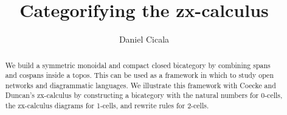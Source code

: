 %
%




% 

%

\begin{abstract}
	We build a symmetric monoidal and 
	compact closed bicategory
	by combining spans and cospans
	inside a topos.
	This can be used as a framework
	in which to study open networks 
	and diagrammatic languages.
	We illustrate this framework with
	Coecke and Duncan's zx-calculus
	by constructing a bicategory with 
	the natural numbers for 0-cells,
	the zx-calculus diagrams for 1-cells, and
	rewrite rules for 2-cells. 
\end{abstract}

\title{Categorifying the zx-calculus}
\author{Daniel Cicala}
\maketitle








\appendix


\printbibliography 
 
% 

%
